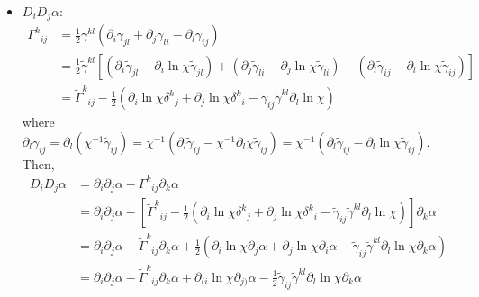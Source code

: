 \documentclass[prd,aps,a4paper,superscriptaddress,onecolumn,footinbib]{revtex4}
\begin{document}
\begin{itemize}
\item $D_iD_j\alpha$:
  \begin{align}
    \Gamma^{k}{}_{ij}
    &=\frac{1}{2}\gamma^{kl}(\partial_i\gamma_{jl}+\partial_j\gamma_{li}-\partial_l\gamma_{ij})
    \\
    &=\frac{1}{2}\tilde\gamma^{kl}
    \left[
      (\partial_i\tilde\gamma_{jl}-\partial_i\ln\chi\tilde\gamma_{jl})+
      (\partial_j\tilde\gamma_{li}-\partial_j\ln\chi\tilde\gamma_{li})-
      (\partial_l\tilde\gamma_{ij}-\partial_l\ln\chi\tilde\gamma_{ij})
    \right]
    \\
    &=\tilde\Gamma^k{}_{ij}
    -\frac{1}{2}
    (\partial_i\ln\chi\delta^k{}_j+\partial_j\ln\chi\delta^k{}_i
    -\tilde\gamma_{ij}\tilde\gamma^{kl}\partial_l\ln\chi)
  \end{align}
  where
  $\partial_l\gamma_{ij}=\partial_l(\chi^{-1}\tilde\gamma_{ij})
  =\chi^{-1}(\partial_l\tilde{\gamma}_{ij}-\chi^{-1}\partial_l\chi\tilde\gamma_{ij})
  =\chi^{-1}(\partial_l\tilde{\gamma}_{ij}-\partial_l\ln\chi\tilde\gamma_{ij})$.
  Then,
  \begin{align}
    D_iD_j\alpha
    &=\partial_i\partial_j\alpha-\Gamma^k{}_{ij}\partial_k\alpha \\
    &=\partial_i\partial_j\alpha-
    \left[
      \tilde\Gamma^k{}_{ij}
      -\frac{1}{2}
      (\partial_i\ln\chi\delta^k{}_j+\partial_j\ln\chi\delta^k{}_i
      -\tilde\gamma_{ij}\tilde\gamma^{kl}\partial_l\ln\chi)
    \right]\partial_k\alpha \\
    &=\partial_i\partial_j\alpha-
    \tilde\Gamma^k{}_{ij}\partial_k\alpha
    +\frac{1}{2}
    (\partial_i\ln\chi\partial_j\alpha
    +\partial_j\ln\chi\partial_i\alpha
    -\tilde\gamma_{ij}\tilde\gamma^{kl}\partial_l\ln\chi\partial_k\alpha) \\
    &=\partial_i\partial_j\alpha-
    \tilde\Gamma^k{}_{ij}\partial_k\alpha
    +\partial_{(i}\ln\chi\partial_{j)}\alpha
    -\frac{1}{2}\tilde\gamma_{ij}\tilde\gamma^{kl}\partial_l\ln\chi\partial_k\alpha
  \end{align}


\end{itemize}
\end{document}
